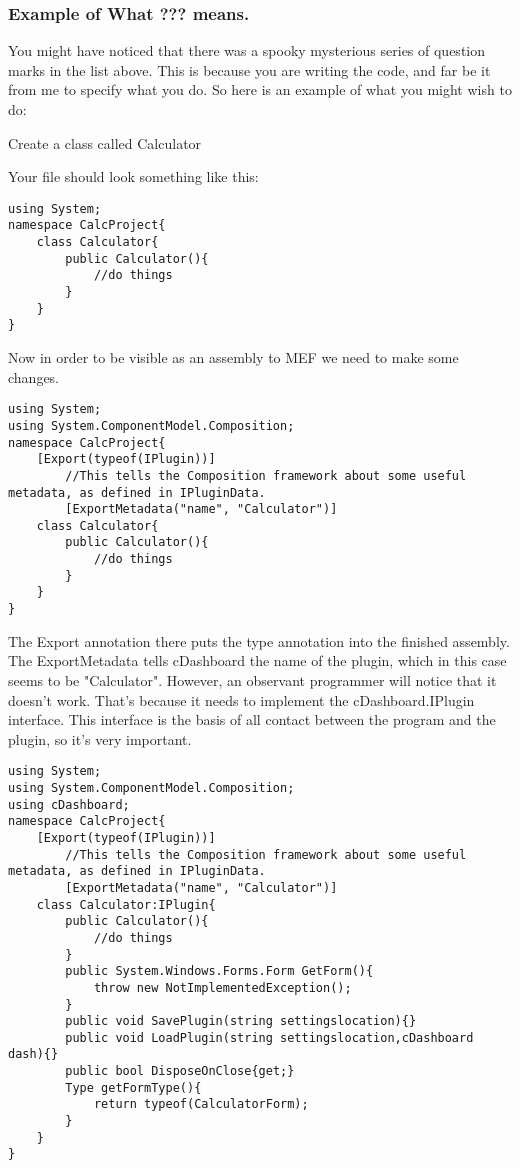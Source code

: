 \documentclass{article}
\begin{document}
\subsubsection{Example of What ??? means.}

You might have noticed that there was a spooky mysterious series of question marks in the list above. This is because you are writing the code, and far be it from me to specify what you do. So here is an example of what you might wish to do:

 Create a class called Calculator


Your file should look something like this:
\begin{lstlisting}[label=Calculator.cs]
using System;
namespace CalcProject{
	class Calculator{
		public Calculator(){
			//do things
		}
	}
}
\end{lstlisting}

Now in order to be visible as an assembly to MEF we need to make some changes.

\begin{lstlisting}[label=Calculator.cs]
using System;
using System.ComponentModel.Composition;
namespace CalcProject{
	[Export(typeof(IPlugin))]
    	//This tells the Composition framework about some useful metadata, as defined in IPluginData.
    	[ExportMetadata("name", "Calculator")]
	class Calculator{
		public Calculator(){
			//do things
		}
	}
}
\end{lstlisting}

The Export annotation there puts the type annotation into the finished assembly. The ExportMetadata tells cDashboard the name of the plugin, which in this case seems to be "Calculator".
 However, an observant programmer will notice that it doesn't work. That's because it needs to implement the cDashboard.IPlugin interface. This interface is the basis of all contact between the program and the plugin, so it's very important.
 
\begin{lstlisting}[label=Calculator.cs]
using System;
using System.ComponentModel.Composition;
using cDashboard;
namespace CalcProject{
	[Export(typeof(IPlugin))]
    	//This tells the Composition framework about some useful metadata, as defined in IPluginData.
    	[ExportMetadata("name", "Calculator")]
	class Calculator:IPlugin{
		public Calculator(){
			//do things
		}
		public System.Windows.Forms.Form GetForm(){
			throw new NotImplementedException();
		}
		public void SavePlugin(string settingslocation){}
		public void LoadPlugin(string settingslocation,cDashboard dash){}
		public bool DisposeOnClose{get;}
		Type getFormType(){
			return typeof(CalculatorForm);
		}
	}
}
\end{lstlisting}
 
\end{document}
